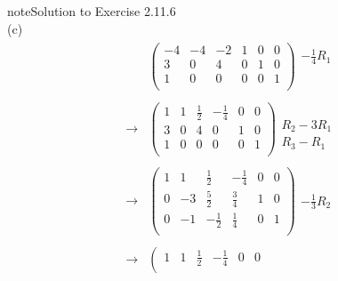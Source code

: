 \documentclass[letterpaper,10pt,english]{jupyterBook}
\begin{document}
\begin{sphinxadmonition}{note}{Solution to Exercise 2.11.6}
\begin{equation*}
\end{equation*}
\sphinxAtStartPar
(c)
\begin{equation*}
\begin{split} \begin{align*} 
    & \left( \begin{array}{ccc|ccc} 
         -4 & -4 & -2 & 1 & 0 & 0 \\ 
         3 & 0 & 4 & 0 & 1 & 0 \\ 
         1 & 0 & 0 & 0 & 0 & 1 \\ 
    \end{array} \right) 
    \begin{array}{l} - \frac{1}{4} R_{1}\\ \phantom{x} \\ \phantom{x} \end{array} \\ \\ 
    \longrightarrow 
    & \left( \begin{array}{ccc|ccc} 
         1 & 1 & \frac{1}{2} & - \frac{1}{4} & 0 & 0 \\ 
         3 & 0 & 4 & 0 & 1 & 0 \\ 
         1 & 0 & 0 & 0 & 0 & 1 \\ 
    \end{array} \right) 
    \begin{array}{l} \phantom{x} \\ R_{2} - 3 R_{1} \\ R_{3} - R_{1} \end{array} \\ \\ 
    \longrightarrow 
    & \left( \begin{array}{ccc|ccc} 
         1 & 1 & \frac{1}{2} & - \frac{1}{4} & 0 & 0 \\ 
         0 & -3 & \frac{5}{2} & \frac{3}{4} & 1 & 0 \\ 
         0 & -1 & - \frac{1}{2} & \frac{1}{4} & 0 & 1 \\ 
    \end{array} \right) 
    \begin{array}{l} \phantom{x} \\ - \frac{1}{3} R_{2}\\ \phantom{x} \end{array} \\ \\ 
    \longrightarrow 
    & \left( \begin{array}{ccc|ccc} 
         1 & 1 & \frac{1}{2} & - \frac{1}{4} & 0 & 0 \\ 

\end{array}
\end{align*}
\end{split}
\end{equation*}
\end{sphinxadmonition}
\end{document}
